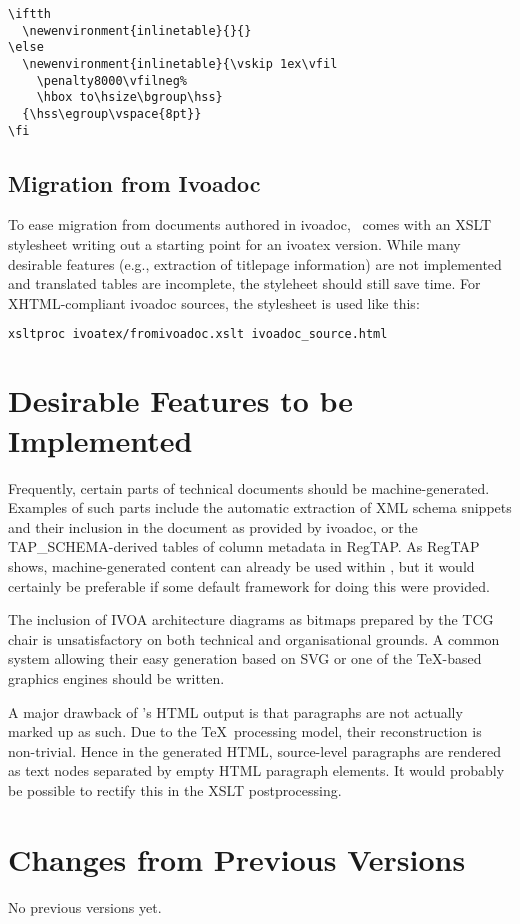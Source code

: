 \documentclass[11pt,a4paper]{ivoa}
\begin{document}
\begin{lstlisting}
\iftth
  \newenvironment{inlinetable}{}{}
\else
  \newenvironment{inlinetable}{\vskip 1ex\vfil
    \penalty8000\vfilneg%
    \hbox to\hsize\bgroup\hss}
  {\hss\egroup\vspace{8pt}}
\fi
\end{lstlisting}


\subsection{Migration from Ivoadoc}

To ease migration from documents authored in ivoadoc, \ivoatex\ comes
with an XSLT stylesheet writing out a starting point for an ivoatex
version.  While many desirable features (e.g., extraction of titlepage
information) are not implemented and translated tables are incomplete,
the styleheet should still save time.  For XHTML-compliant ivoadoc
sources, the stylesheet is used like this:

\begin{lstlisting}[language=sh]
xsltproc ivoatex/fromivoadoc.xslt ivoadoc_source.html
\end{lstlisting}


\section{Desirable Features to be Implemented}

Frequently, certain parts of technical documents should be
machine-ge\-ne\-ra\-ted.  Examples of such parts include the automatic
extraction of XML schema snippets and their inclusion in the document
as provided by ivoadoc, or the TAP\_SCHEMA-derived tables of column
metadata in RegTAP.  As RegTAP shows, machine-generated content can
already be used within \ivoatex, but it would certainly be preferable if
some default framework for doing this were provided.

The inclusion of IVOA architecture diagrams as bitmaps prepared by the
TCG chair is unsatisfactory on both technical and organisational
grounds.  A common system allowing their easy generation based on SVG or
one of the \TeX-based graphics engines should be written.

A major drawback of \ivoatex's HTML output is that paragraphs are not actually
marked up as such.  Due to the \TeX\ processing model, their
reconstruction is non-trivial.  Hence in the generated HTML,
source-level paragraphs are rendered as text nodes separated by empty
HTML paragraph elements.  It would probably be possible to rectify this
in the XSLT postprocessing.


\appendix
\section{Changes from Previous Versions}

No previous versions yet.  



\end{document}
